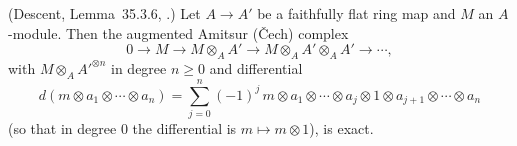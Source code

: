 \begin{lemma}
\label{lem:pc-cech-exact}
(Descent, Lemma~35.3.6, .)  Let $A\to A'$ be a
faithfully flat ring map and $M$ an $A$-module.  Then the augmented
Amitsur (Čech) complex
\[
0\longrightarrow M\longrightarrow M\otimes_AA'
\longrightarrow M\otimes_AA'\otimes_AA'\longrightarrow\cdots,
\]
with $M\otimes_AA'^{\otimes n}$ in degree $n\ge0$ and differential
\[
d(m\otimes a_1\otimes\cdots\otimes a_n)=\sum_{j=0}^{n}(-1)^{j}\,
m\otimes a_1\otimes\cdots\otimes a_j\otimes1\otimes a_{j+1}
\otimes\cdots\otimes a_n
\]
(so that in degree $0$ the differential is $m\mapsto m\otimes1$), is
exact.
\end{lemma}
